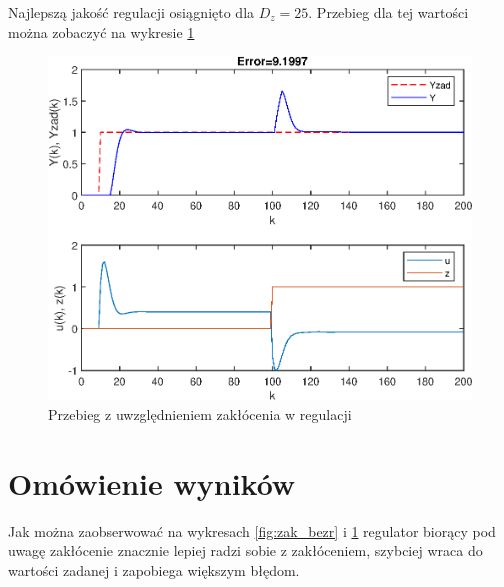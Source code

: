 Najlepszą jakość regulacji osiągnięto dla $D_z = 25$. Przebieg dla tej wartości można zobaczyć na wykresie \ref{fig:zak_zr}

\begin{figure}[h!]
	\centering
	\includegraphics[scale=1]{Rys/zak_zr.eps}
	\caption{Przebieg z uwzględnieniem zakłócenia w regulacji}
	\label{fig:zak_zr}
\end{figure}

\FloatBarrier

\section{Omówienie wyników}
Jak można zaobserwować na wykresach \ref{fig:zak_bezr} i \ref{fig:zak_zr} regulator biorący pod uwagę zakłócenie znacznie lepiej radzi sobie z zakłóceniem, szybciej wraca do wartości zadanej i zapobiega większym błędom.